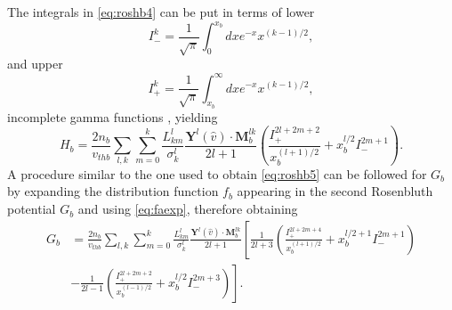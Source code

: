 The integrals in \cref{eq:roshb4} can be put in terms of lower
%
\begin{equation}
    I_-^k=\frac{1}{\sqrt{\pi}}\int_0^{x_b} dx e^{-x} x^{(k-1)/2},
\end{equation}
%
and upper
%
\begin{equation}
    I_+^k=\frac{1}{\sqrt{\pi}}\int_{x_b}^{\infty} dx e^{-x} x^{(k-1)/2},
\end{equation}
%
incomplete gamma functions \citep{Abramowitz1972}, yielding
%
\begin{equation}
    H_b = \frac{2n_b}{v_{thb}} \sum_{l,k} \sum_{m=0}^k \frac{L_{km}^{l}}{\sigma_k^l}\frac{\mathbf Y^{l}(\hat v) \cdot \mathbf M_b^{lk}}{2l+1} \left(\frac{I_+^{2l+2m+2}}{x_b^{(l+1)/2}}+x_b^{l/2}I_-^{2m+1}\right).
\label{eq:roshb5}
\end{equation}
%
A procedure similar to the one used to obtain \cref{eq:roshb5} can be followed for $G_b$ by expanding the distribution function $f_b$ appearing in the second Rosenbluth potential $G_b$ and using  \cref{eq:faexp}, therefore obtaining
%
\begin{equation}
\begin{split}
    G_b &= \frac{2n_b}{v_{thb}} \sum_{l,k} \sum_{m=0}^k \frac{L_{km}^{l}}{\sigma_k^l}\frac{\mathbf Y^{l}(\hat v) \cdot \mathbf M_b^{lk}}{2l+1}\left[\frac{1}{2l+3} \left(\frac{I_+^{2l+2m+4}}{x_b^{(l+1)/2}}+x_b^{l/2+1}I_-^{2m+1}\right)\right.\\
    &\left.-\frac{1}{2l-1}\left(\frac{I_+^{2l+2m+2}}{x_b^{(l-1)/2}}+x_b^{l/2}I_-^{2m+3}\right)\right].
\end{split}
\label{eq:rosgb1}
\end{equation}

